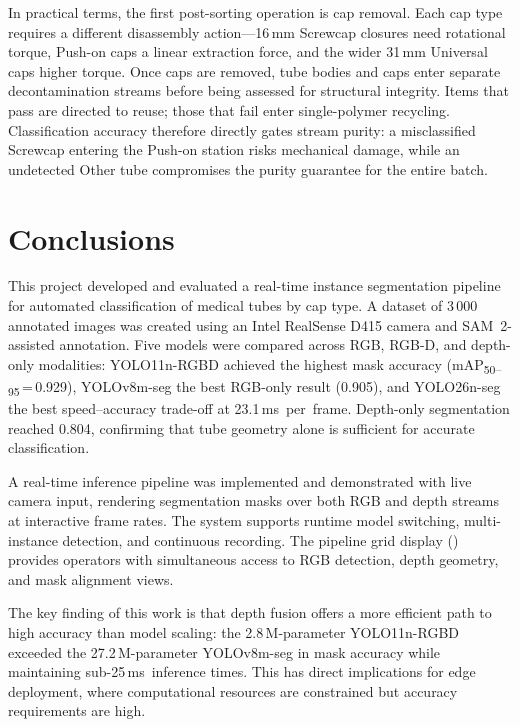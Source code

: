 \documentclass{Academic}
\begin{document}
In practical terms, the first post-sorting operation is cap removal. Each cap type requires a different disassembly action---16\,mm Screwcap closures need rotational torque, Push-on caps a linear extraction force, and the wider 31\,mm Universal caps higher torque. Once caps are removed, tube bodies and caps enter separate decontamination streams before being assessed for structural integrity. Items that pass are directed to reuse; those that fail enter single-polymer recycling. Classification accuracy therefore directly gates stream purity: a misclassified Screwcap entering the Push-on station risks mechanical damage, while an undetected Other tube compromises the purity guarantee for the entire batch.

\section{Conclusions}

This project developed and evaluated a real-time instance segmentation pipeline for automated classification of medical tubes by cap type. A dataset of 3\,000 annotated images was created using an Intel RealSense D415 camera and SAM~2-assisted annotation. Five models were compared across RGB, RGB-D, and depth-only modalities: YOLO11n-RGBD achieved the highest mask accuracy (mAP\textsubscript{50--95}\,=\,0.929), YOLOv8m-seg the best RGB-only result (0.905), and YOLO26n-seg the best speed--accuracy trade-off at 23.1\,ms~per~frame. Depth-only segmentation reached 0.804, confirming that tube geometry alone is sufficient for accurate classification.

A real-time inference pipeline was implemented and demonstrated with live camera input, rendering segmentation masks over both RGB and depth streams at interactive frame rates. The system supports runtime model switching, multi-instance detection, and continuous recording. The pipeline grid display () provides operators with simultaneous access to RGB detection, depth geometry, and mask alignment views.

The key finding of this work is that depth fusion offers a more efficient path to high accuracy than model scaling: the 2.8\,M-parameter YOLO11n-RGBD exceeded the 27.2\,M-parameter YOLOv8m-seg in mask accuracy while maintaining sub-25\,ms~inference times. This has direct implications for edge deployment, where computational resources are constrained but accuracy requirements are high.
\end{document}
